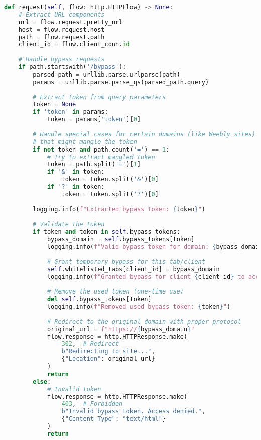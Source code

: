 \begin{lstlisting}[language=Python, caption=Bypass Token System]
def request(self, flow: http.HTTPFlow) -> None:
    # Extract URL components
    url = flow.request.pretty_url
    host = flow.request.host
    path = flow.request.path
    client_id = flow.client_conn.id
    
    # Handle bypass requests
    if path.startswith('/bypass'):
        parsed_path = urllib.parse.urlparse(path)
        params = urllib.parse.parse_qs(parsed_path.query)
        
        # Extract token from query parameters
        token = None
        if 'token' in params:
            token = params['token'][0]
            
        # Handle special cases for certain domains (like Weebly sites)
        # that might mangle the token
        if not token and path.count('=') == 1:
            # Try to extract mangled token
            token = path.split('=')[1]
            if '&' in token:
                token = token.split('&')[0]
            if '?' in token:
                token = token.split('?')[0]
                
        logging.info(f"Extracted bypass token: {token}")
            
        # Validate the token
        if token and token in self.bypass_tokens:
            bypass_domain = self.bypass_tokens[token]
            logging.info(f"Valid bypass token for domain: {bypass_domain}")
            
            # Grant temporary bypass for this tab/client
            self.whitelisted_tabs[client_id] = bypass_domain
            logging.info(f"Granted bypass for client {client_id} to access {bypass_domain}")
            
            # Remove the used token (one-time use)
            del self.bypass_tokens[token]
            logging.info(f"Removed used bypass token: {token}")
            
            # Redirect to the original domain with proper protocol
            original_url = f"https://{bypass_domain}"
            flow.response = http.HTTPResponse.make(
                302,  # Redirect
                b"Redirecting to site...",
                {"Location": original_url}
            )
            return
        else:
            # Invalid token
            flow.response = http.HTTPResponse.make(
                403,  # Forbidden
                b"Invalid bypass token. Access denied.",
                {"Content-Type": "text/html"}
            )
            return
\end{lstlisting}

